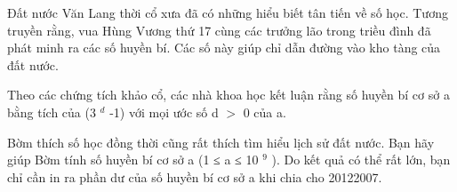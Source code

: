 Đất nước Văn Lang thời cổ xưa đã có những hiểu biết tân tiến về số học. Tương truyền rằng, vua Hùng Vương thứ 17 cùng các trưởng lão   trong triều đình đã phát minh ra các số huyền bí. Các số này giúp chỉ dẫn đường vào kho tàng của đất nước.  

   Theo các chứng tích khảo cổ, các nhà khoa học kết luận rằng số huyền bí cơ sở a bằng tích của (3   $^    d   $   -1) với mọi ước số d $>$ 0   của a.  

   Bờm thích số học đồng thời cũng rất thích tìm hiểu lịch sử đất nước. Bạn hãy giúp Bờm tính số huyền bí cơ sở a (1 ≤ a ≤ 10   $^    9   $   ).   Do kết quả có thể rất lớn, bạn chỉ cần in ra phần dư của số huyền bí cơ sở a khi chia cho 20122007.